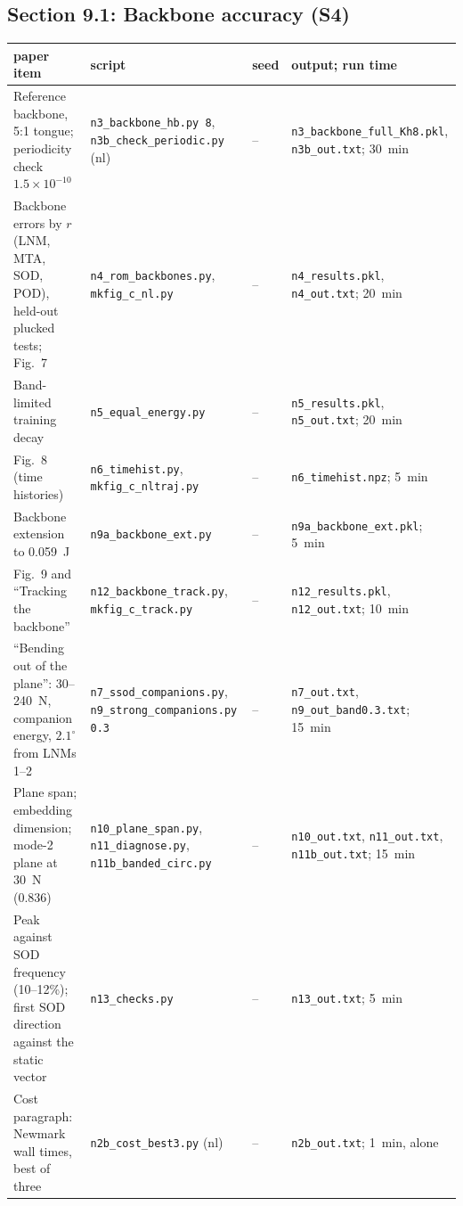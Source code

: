 \documentclass[10pt]{article}
\newcommand{\f}[1]{\texttt{#1}}
\begin{document}
\subsection*{Section 9.1: Backbone accuracy (S4)}
\begin{longtable}{L{0.31\textwidth}L{0.25\textwidth}L{0.08\textwidth}L{0.25\textwidth}}
\toprule
paper item & script & seed & output; run time\\ \midrule
Reference backbone, 5:1 tongue; periodicity check $1.5\times10^{-10}$ & \f{n3\_\allowbreak{}backbone\_\allowbreak{}hb.py 8}, \f{n3b\_\allowbreak{}check\_\allowbreak{}periodic.py} (nl) & -- & \f{n3\_\allowbreak{}backbone\_\allowbreak{}full\_\allowbreak{}Kh8.pkl}, \f{n3b\_\allowbreak{}out.txt}; 30~min\\
Backbone errors by $r$ (LNM, MTA, SOD, POD), held-out plucked tests; Fig.~7 & \f{n4\_\allowbreak{}rom\_\allowbreak{}backbones.py}, \f{mkfig\_\allowbreak{}c\_\allowbreak{}nl.py} & -- & \f{n4\_\allowbreak{}results.pkl}, \f{n4\_\allowbreak{}out.txt}; 20~min\\
Band-limited training decay & \f{n5\_\allowbreak{}equal\_\allowbreak{}energy.py} & -- & \f{n5\_\allowbreak{}results.pkl}, \f{n5\_\allowbreak{}out.txt}; 20~min\\
Fig.~8 (time histories) & \f{n6\_\allowbreak{}timehist.py}, \f{mkfig\_\allowbreak{}c\_\allowbreak{}nltraj.py} & -- & \f{n6\_\allowbreak{}timehist.npz}; 5~min\\
Backbone extension to 0.059~J & \f{n9a\_\allowbreak{}backbone\_\allowbreak{}ext.py} & -- & \f{n9a\_\allowbreak{}backbone\_\allowbreak{}ext.pkl}; 5~min\\
Fig.~9 and ``Tracking the backbone'' & \f{n12\_\allowbreak{}backbone\_\allowbreak{}track.py}, \f{mkfig\_\allowbreak{}c\_\allowbreak{}track.py} & -- & \f{n12\_\allowbreak{}results.pkl}, \f{n12\_\allowbreak{}out.txt}; 10~min\\
``Bending out of the plane'': 30--240~N, companion energy, $2.1^\circ$ from LNMs 1--2 & \f{n7\_\allowbreak{}ssod\_\allowbreak{}companions.py}, \f{n9\_\allowbreak{}strong\_\allowbreak{}companions.py 0.3} & -- & \f{n7\_\allowbreak{}out.txt}, \f{n9\_\allowbreak{}out\_\allowbreak{}band0.3.txt}; 15~min\\
Plane span; embedding dimension; mode-2 plane at 30~N (0.836) & \f{n10\_\allowbreak{}plane\_\allowbreak{}span.py}, \f{n11\_\allowbreak{}diagnose.py}, \f{n11b\_\allowbreak{}banded\_\allowbreak{}circ.py} & -- & \f{n10\_\allowbreak{}out.txt}, \f{n11\_\allowbreak{}out.txt}, \f{n11b\_\allowbreak{}out.txt}; 15~min\\
Peak against SOD frequency (10--12\%); first SOD direction against the static vector & \f{n13\_\allowbreak{}checks.py} & -- & \f{n13\_\allowbreak{}out.txt}; 5~min\\
Cost paragraph: Newmark wall times, best of three & \f{n2b\_\allowbreak{}cost\_\allowbreak{}best3.py} (nl) & -- & \f{n2b\_\allowbreak{}out.txt}; 1~min, alone\\
\bottomrule
\end{longtable}
\end{document}
